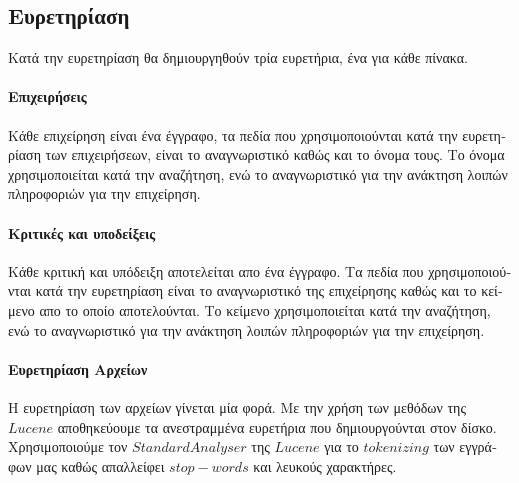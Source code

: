 \newpage
\subsection{\textgreek{Ευρετηρίαση}}
    \textgreek{
        Κατά την ευρετηρίαση θα δημιουργηθούν τρία ευρετήρια, ένα για κάθε πίνακα.
    }

    \paragraph{\textgreek{Επιχειρήσεις}} {
        \textgreek{
            Κάθε επιχείρηση είναι ένα έγγραφο, τα πεδία που χρησιμοποιούνται
            κατά την ευρετηρίαση των επιχειρήσεων, είναι το αναγνωριστικό καθώς
            και το όνομα τους. Το όνομα χρησιμοποιείται κατά την αναζήτηση, ενώ
            το αναγνωριστικό για την ανάκτηση λοιπών πληροφοριών για την επιχείρηση.
        }
    }

    \paragraph{\textgreek{Κριτικές και υποδείξεις}} {
        \textgreek{
            Κάθε κριτική και υπόδειξη αποτελείται απο ένα έγγραφο. Τα πεδία
            που χρησιμοποιούνται κατά την ευρετηρίαση είναι το αναγνωριστικό
            της επιχείρησης καθώς και το κείμενο απο το οποίο αποτελούνται.
            Το κείμενο χρησιμοποιείται κατά την αναζήτηση, ενώ το
            αναγνωριστικό για την ανάκτηση λοιπών πληροφοριών για την επιχείρηση.
        }
    \paragraph{\textgreek{Ευρετηρίαση Αρχείων}}{
        \textgreek{
            Η ευρετηρίαση των αρχείων γίνεται μία φορά. Με την χρήση των μεθόδων της
            $Lucene$ αποθηκεύουμε τα ανεστραμμένα ευρετήρια που δημιουργούνται στον δίσκο.
            \newline Χρησιμοποιούμε τον $StandardAnalyser$ της $Lucene$ για το $tokenizing$ των εγγράφων μας
            καθώς απαλλείφει $stop-words$ και λευκούς χαρακτήρες.
        }
    }
}
